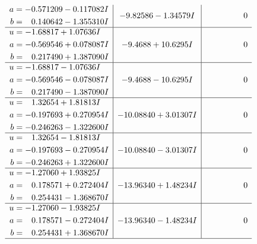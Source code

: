\documentclass[1p]{elsarticle_modified}
\theoremstyle{definition}
\begin{document}
$$\begin{array}{c|c|c}
\begin{aligned}
a &= -0.571209 - 0.117082 I \\
b &= \phantom{-}0.140642 - 1.355310 I\end{aligned}
 & -9.82586 - 1.34579 I & \phantom{-0.000000 } 0 \\ \hline\begin{aligned}
u &= -1.68817 + 1.07636 I \\
a &= -0.569546 + 0.078087 I \\
b &= \phantom{-}0.217490 + 1.387090 I\end{aligned}
 & -9.4688 + 10.6295 I & \phantom{-0.000000 } 0 \\ \hline\begin{aligned}
u &= -1.68817 - 1.07636 I \\
a &= -0.569546 - 0.078087 I \\
b &= \phantom{-}0.217490 - 1.387090 I\end{aligned}
 & -9.4688 - 10.6295 I & \phantom{-0.000000 } 0 \\ \hline\begin{aligned}
u &= \phantom{-}1.32654 + 1.81813 I \\
a &= -0.197693 + 0.270954 I \\
b &= -0.246263 - 1.322600 I\end{aligned}
 & -10.08840 + 3.01307 I & \phantom{-0.000000 } 0 \\ \hline\begin{aligned}
u &= \phantom{-}1.32654 - 1.81813 I \\
a &= -0.197693 - 0.270954 I \\
b &= -0.246263 + 1.322600 I\end{aligned}
 & -10.08840 - 3.01307 I & \phantom{-0.000000 } 0 \\ \hline\begin{aligned}
u &= -1.27060 + 1.93825 I \\
a &= \phantom{-}0.178571 + 0.272404 I \\
b &= \phantom{-}0.254431 - 1.368670 I\end{aligned}
 & -13.96340 + 1.48234 I & \phantom{-0.000000 } 0 \\ \hline\begin{aligned}
u &= -1.27060 - 1.93825 I \\
a &= \phantom{-}0.178571 - 0.272404 I \\
b &= \phantom{-}0.254431 + 1.368670 I\end{aligned}
 & -13.96340 - 1.48234 I & \phantom{-0.000000 } 0\\
 \hline 
 \end{array}$$\newpage$$\begin{array}{c|c|c}  

\end{array}$$
\end{document}
